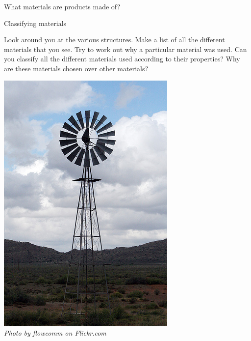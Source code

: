 \begin{activity}{What materials are products made of?}
{\begin{minipage}{.25\textwidth}
\begin{center}
\end{center}
\end{minipage}

 }  \end{activity}
\par
\begin{activity}{Classifying materials} {
\begin{minipage}{.4\textwidth}
Look around you at the various structures. Make a list of all the different materials that you see. Try to work out why a particular material was used. Can you classify all the different materials used according to their properties? Why are these materials chosen over other materials?
\end{minipage}
\begin{minipage}{.25\textwidth}
\begin{center}
 \includegraphics[height=.8\textwidth]{photos/windmillby-flowcomm-flickr.jpg}\\
\textit{Photo by flowcomm on Flickr.com}
\end{center}
\end{minipage}
\begin{minipage}{.25\textwidth}
\begin{center}

\end{center}
\end{minipage}}
\end{activity}
